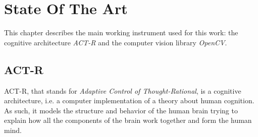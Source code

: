 \chapter{State Of The Art}
This chapter describes the main working instrument used for this work: the cognitive architecture \emph{\mbox{ACT-R}} and the computer vision library \emph{\mbox{OpenCV}}. 

	
	
  \section{ACT-R}
	\mbox{ACT-R}, that stands for \emph{Adaptive Control of Thought-Rational}, is a cognitive architecture, i.e. a computer implementation of a theory about human cognition. As such, it models the structure and behavior of the human brain trying to explain how all the components of the brain work together and form the human mind.

